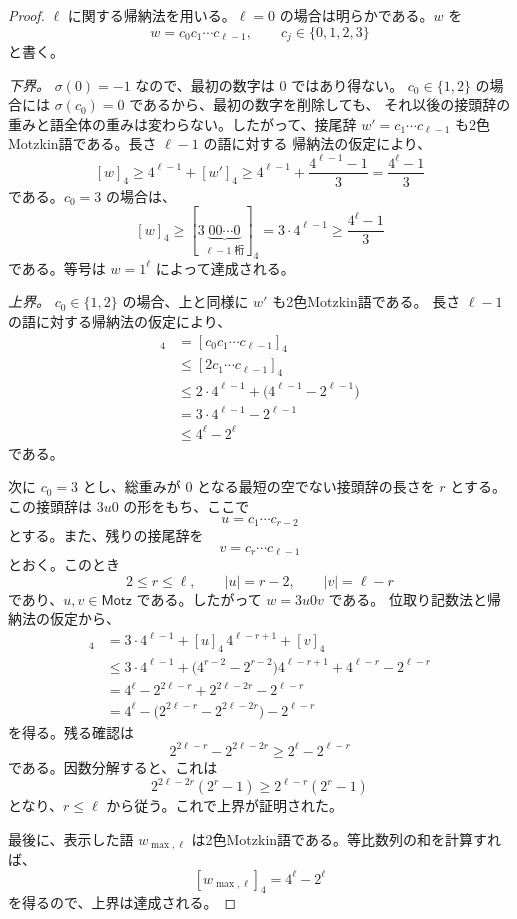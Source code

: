 \documentclass[12pt]{ltjsarticle}
\theoremstyle{plain}
\theoremstyle{definition}
\theoremstyle{plain}
\begin{document}
\begin{proof}
$\ell$ に関する帰納法を用いる。$\ell=0$ の場合は明らかである。$w$ を
\[
 w=c_0c_1\cdots c_{\ell-1},
 \qquad
 c_j\in\{0,1,2,3\}
\]
と書く。

\emph{下界。}
$\sigma(0)=-1$ なので、最初の数字は $0$ ではあり得ない。
$c_0\in\{1,2\}$ の場合には $\sigma(c_0)=0$ であるから、最初の数字を削除しても、
それ以後の接頭辞の重みと語全体の重みは変わらない。したがって、接尾辞
$w'=c_1\cdots c_{\ell-1}$ も2色Motzkin語である。長さ $\ell-1$ の語に対する
帰納法の仮定により、
\[
  [w]_4\geq4^{\ell-1}+[w']_4
  \geq4^{\ell-1}+\frac{4^{\ell-1}-1}{3}
  =\frac{4^{\ell}-1}{3}
\]
である。$c_0=3$ の場合は、
\[
  [w]_4
  \geq[3\underbrace{00\cdots0}_{\ell-1\text{ 桁}}]_4
  =3\cdot4^{\ell-1}
  \geq\frac{4^{\ell}-1}{3}
\]
である。等号は $w=1^{\ell}$ によって達成される。

\emph{上界。}
$c_0\in\{1,2\}$ の場合、上と同様に $w'$ も2色Motzkin語である。
長さ $\ell-1$ の語に対する帰納法の仮定により、
\begin{align*}
  [w]_4
  &=[c_0c_1\cdots c_{\ell-1}]_4\\
  &\leq[2c_1\cdots c_{\ell-1}]_4\\
  &\leq2\cdot4^{\ell-1}+\bigl(4^{\ell-1}-2^{\ell-1}\bigr)\\
  &=3\cdot4^{\ell-1}-2^{\ell-1}\\
  &\leq4^{\ell}-2^{\ell}
\end{align*}
である。

次に $c_0=3$ とし、総重みが $0$ となる最短の空でない接頭辞の長さを $r$ とする。
この接頭辞は $3u0$ の形をもち、ここで
\[
 u=c_1\cdots c_{r-2}
\]
とする。また、残りの接尾辞を
\[
 v=c_r\cdots c_{\ell-1}
\]
とおく。このとき
\[
 2\leq r\leq\ell,
 \qquad
 |u|=r-2,
 \qquad
 |v|=\ell-r
\]
であり、$u,v\in\mathsf{Motz}$ である。したがって $w=3u0v$ である。
位取り記数法と帰納法の仮定から、
\begin{align*}
  [w]_4
  &=3\cdot4^{\ell-1}+[u]_4\,4^{\ell-r+1}+[v]_4\\
  &\leq3\cdot4^{\ell-1}
    +\bigl(4^{r-2}-2^{r-2}\bigr)4^{\ell-r+1}
    +4^{\ell-r}-2^{\ell-r}\\
  &=4^{\ell}-2^{2\ell-r}+2^{2\ell-2r}-2^{\ell-r}\\
  &=4^{\ell}-\bigl(2^{2\ell-r}-2^{2\ell-2r}\bigr)-2^{\ell-r}
\end{align*}
を得る。残る確認は
\[
  2^{2\ell-r}-2^{2\ell-2r}
  \geq2^{\ell}-2^{\ell-r}
\]
である。因数分解すると、これは
\[
  2^{2\ell-2r}(2^r-1)\geq2^{\ell-r}(2^r-1)
\]
となり、$r\leq\ell$ から従う。これで上界が証明された。

最後に、表示した語 $w_{\max,\ell}$ は2色Motzkin語である。等比数列の和を計算すれば、
\[
  [w_{\max,\ell}]_4=4^{\ell}-2^{\ell}
\]
を得るので、上界は達成される。
\end{proof}
\end{document}
